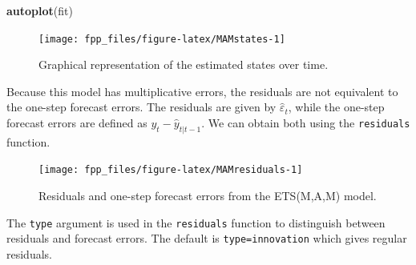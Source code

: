 \documentclass[]{book}
\newenvironment{Shaded}{\begin{snugshade}}{\end{snugshade}}
\newcommand{\DataTypeTok}[1]{\textcolor[rgb]{0.13,0.29,0.53}{#1}}
\newcommand{\KeywordTok}[1]{\textcolor[rgb]{0.13,0.29,0.53}{\textbf{#1}}}
\newcommand{\NormalTok}[1]{#1}
\newcommand{\OperatorTok}[1]{\textcolor[rgb]{0.81,0.36,0.00}{\textbf{#1}}}
\newcommand{\OtherTok}[1]{\textcolor[rgb]{0.56,0.35,0.01}{#1}}
\newcommand{\StringTok}[1]{\textcolor[rgb]{0.31,0.60,0.02}{#1}}
\begin{document}
\begin{Shaded}
\begin{Highlighting}[]
\KeywordTok{autoplot}\NormalTok{(fit)}
\end{Highlighting}
\end{Shaded}

\begin{figure}

{\centering \texttt{[image: fpp\_files/figure-latex/MAMstates-1]} 

}

\caption{Graphical representation of the estimated states over time.}\label{fig:MAMstates}
\end{figure}

Because this model has multiplicative errors, the residuals are not equivalent to the one-step forecast errors. The residuals are given by \(\hat{\varepsilon}_t\), while the one-step forecast errors are defined as \(y_t - \hat{y}_{t|t-1}\). We can obtain both using the \texttt{residuals} function.

\begin{Shaded}
\end{Shaded}

\begin{figure}

{\centering \texttt{[image: fpp\_files/figure-latex/MAMresiduals-1]} 

}

\caption{Residuals and one-step forecast errors from the ETS(M,A,M) model.}\label{fig:MAMresiduals}
\end{figure}

The \texttt{type} argument is used in the \texttt{residuals} function to distinguish between residuals and forecast errors. The default is \texttt{type=\textquotesingle{}innovation\textquotesingle{}} which gives regular residuals.
\end{document}
